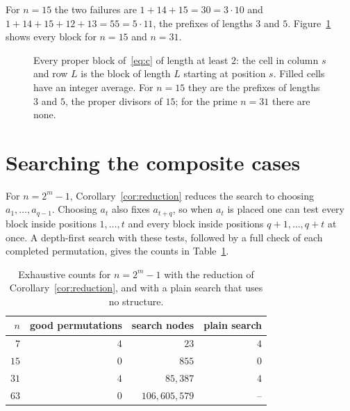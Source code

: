 \documentclass[11pt]{amsart}
\theoremstyle{remark}
\begin{document}
For $n=15$ the two failures are $1+14+15=30=3\cdot10$ and $1+14+15+12+13=55=5\cdot11$, the prefixes of lengths $3$ and $5$. Figure~\ref{fig:blocks} shows every block for $n=15$ and $n=31$.

\begin{figure}[ht]
\centering
{}\qquad
{}
\caption{Every proper block of~\eqref{eq:c} of length at least $2$: the cell in column $s$ and row $L$ is the block of length $L$ starting at position $s$. Filled cells have an integer average. For $n=15$ they are the prefixes of lengths $3$ and $5$, the proper divisors of $15$; for the prime $n=31$ there are none.}
\label{fig:blocks}
\end{figure}

\section{Searching the composite cases}\label{sec:search}

For $n=2^m-1$, Corollary~\ref{cor:reduction} reduces the search to choosing $a_1,\dots,a_{q-1}$. Choosing $a_t$ also fixes $a_{t+q}$, so when $a_t$ is placed one can test every block inside positions $1,\dots,t$ and every block inside positions $q+1,\dots,q+t$ at once. A depth-first search with these tests, followed by a full check of each completed permutation, gives the counts in Table~\ref{tab:counts}.

\begin{table}[ht]
\centering
\begin{tabular}{rrrr}
\toprule
$n$ & good permutations & search nodes & plain search \\
\midrule
$7$ & $4$ & $23$ & $4$ \\
$15$ & $0$ & $855$ & $0$ \\
$31$ & $4$ & $85{,}387$ & $4$ \\
$63$ & $0$ & $106{,}605{,}579$ & -- \\
\bottomrule
\end{tabular}
\caption{Exhaustive counts for $n=2^m-1$ with the reduction of Corollary~\ref{cor:reduction}, and with a plain search that uses no structure.}
\label{tab:counts}
\end{table}
\end{document}
